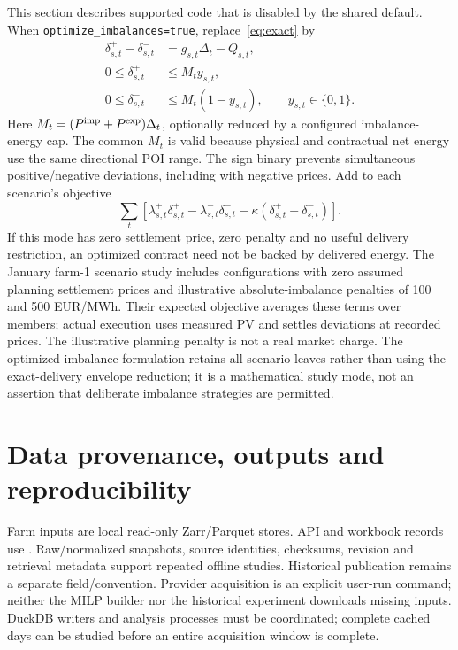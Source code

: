 \documentclass[11pt,a4paper]{article}
\begin{document}
This section describes supported code that is disabled by the shared default.
When \texttt{optimize\_imbalances=true}, replace~\eqref{eq:exact} by
\begin{align}
 \delta^+_{s,t}-\delta^-_{s,t}&=g_{s,t}\Delta_t-Q_{s,t},\\
 0\le\delta^+_{s,t}&\le M_t y_{s,t},\\
 0\le\delta^-_{s,t}&\le M_t(1-y_{s,t}),\qquad y_{s,t}\in\{0,1\}.
\end{align}
Here $M_t=(P^{\rm imp}+P^{\rm exp})\Delta_t$, optionally reduced by a configured
imbalance-energy cap. The common $M_t$ is valid because physical and contractual
net energy use the same directional POI range. The sign binary prevents
simultaneous positive/negative deviations, including with negative prices.
Add to each scenario's objective
\begin{equation}
 \sum_t\left[\lambda^+_{s,t}\delta^+_{s,t}
      -\lambda^-_{s,t}\delta^-_{s,t}
      -\kappa(\delta^+_{s,t}+\delta^-_{s,t})\right].
\end{equation}
If this mode has zero settlement price, zero penalty and no useful delivery
restriction, an optimized contract need not be backed by delivered energy.
The January farm-1 scenario study includes configurations with zero assumed
planning settlement prices and illustrative absolute-imbalance penalties of
100 and 500 EUR/MWh. Their expected objective averages these terms over members;
actual execution uses measured PV and settles deviations at recorded prices.
The illustrative planning penalty is not a real market charge. The
optimized-imbalance formulation retains all scenario leaves rather than using
the exact-delivery envelope reduction; it is a mathematical study mode, not an
assertion that deliberate imbalance strategies are permitted.

\section{Data provenance, outputs and reproducibility}

Farm inputs are local read-only Zarr/Parquet stores. API and workbook records use
. Raw/normalized snapshots, source identities,
checksums, revision and retrieval metadata support repeated offline studies.
Historical publication remains a separate field/convention. Provider acquisition
is an explicit user-run command; neither the MILP builder nor the historical
experiment downloads missing inputs. DuckDB writers and analysis processes must
be coordinated; complete cached days can be studied before an entire acquisition
window is complete.
\end{document}
